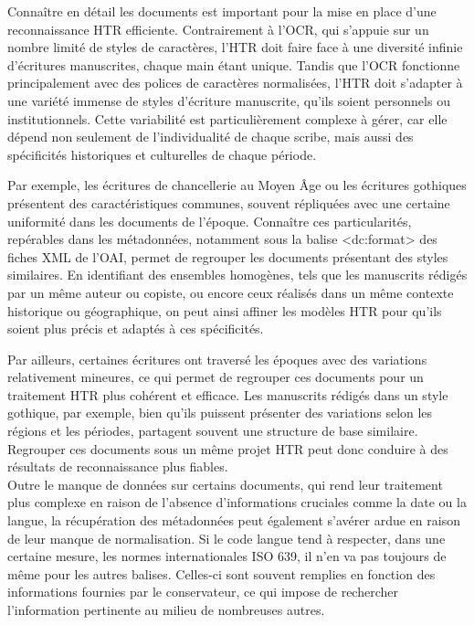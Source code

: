 \documentclass[a4paper,12pt,twoside]{book}
\begin{document}
	Connaître en détail les documents est important pour la mise en place d’une reconnaissance HTR efficiente. Contrairement à l’OCR, qui s’appuie sur un nombre limité de styles de caractères, l’HTR doit faire face à une diversité infinie d’écritures manuscrites, chaque main étant unique. Tandis que l’OCR fonctionne principalement avec des polices de caractères normalisées, l’HTR doit s’adapter à une variété immense de styles d’écriture manuscrite, qu’ils soient personnels ou institutionnels. Cette variabilité est particulièrement complexe à gérer, car elle dépend non seulement de l’individualité de chaque scribe, mais aussi des spécificités historiques et culturelles de chaque période.
	
	Par exemple, les écritures de chancellerie au Moyen Âge ou les écritures gothiques présentent des caractéristiques communes, souvent répliquées avec une certaine uniformité dans les documents de l’époque. Connaître ces particularités, repérables dans les métadonnées, notamment sous la balise <dc:format> des fiches XML de l’OAI, permet de regrouper les documents présentant des styles similaires. En identifiant des ensembles homogènes, tels que les manuscrits rédigés par un même auteur ou copiste, ou encore ceux réalisés dans un même contexte historique ou géographique, on peut ainsi affiner les modèles HTR pour qu’ils soient plus précis et adaptés à ces spécificités.
	
	Par ailleurs, certaines écritures ont traversé les époques avec des variations relativement mineures, ce qui permet de regrouper ces documents pour un traitement HTR plus cohérent et efficace. Les manuscrits rédigés dans un style gothique, par exemple, bien qu’ils puissent présenter des variations selon les régions et les périodes, partagent souvent une structure de base similaire. Regrouper ces documents sous un même projet HTR peut donc conduire à des résultats de reconnaissance plus fiables. 
	\\
	
	Outre le manque de données sur certains documents, qui rend leur traitement plus complexe en raison de l’absence d’informations cruciales comme la date ou la langue, la récupération des métadonnées peut également s’avérer ardue en raison de leur manque de normalisation. Si le code langue tend à respecter, dans une certaine mesure, les normes internationales ISO 639, il n’en va pas toujours de même pour les autres balises. Celles-ci sont souvent remplies en fonction des informations fournies par le conservateur, ce qui impose de rechercher l’information pertinente au milieu de nombreuses autres.
	\\
	
\end{document}
